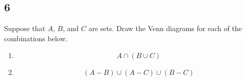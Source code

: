\documentclass[letterpaper, 12pt]{math}
\begin{document}
\subsection*{6}
Suppose that \( A \), \( B \), and \( C \) are sets. Draw the Venn diagrams
for each of the combinations below.
\begin{enumerate}
  \item
  \[ A \cap (B \cup C) \]
  \begin{center}
    \def\firstcircle{(90:1.75cm) circle (2.5cm)}
    \def\secondcircle{(210:1.75cm) circle (2.5cm)}
    \def\thirdcircle{(330:1.75cm) circle (2.5cm)}
  \end{center}
  \item
  \[ (A-B) \cup (A-C) \cup (B-C) \]
  \begin{center}
    \def\firstcircle{(90:1.75cm) circle (2.5cm)}
    \def\secondcircle{(210:1.75cm) circle (2.5cm)}
    \def\thirdcircle{(330:1.75cm) circle (2.5cm)}
  \end{center}
\end{enumerate}
\end{document}

